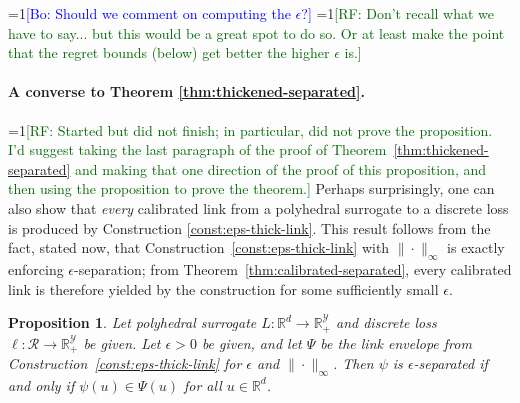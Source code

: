 \documentclass[11pt]{article}
\newcommand{\Comments}{1}
\newcommand{\mynote}[2]{\ifnum\Comments=1\textcolor{#1}{#2}\fi}
\newcommand{\raf}[1]{\mynote{darkgreen}{[RF: #1]}}
\newcommand{\bo}[1]{\mynote{blue}{[Bo: #1]}}
\newcommand{\reals}{\mathbb{R}}
\newcommand{\R}{\mathcal{R}}
\newcommand{\Y}{\mathcal{Y}}
\newtheorem{proposition}{Proposition}
\begin{document}
\bo{Should we comment on computing the $\epsilon$?}
\raf{Don't recall what we have to say... but this would be a great spot to do so.  Or at least make the point that the regret bounds (below) get better the higher $\epsilon$ is.}

\paragraph{A converse to Theorem \ref{thm:thickened-separated}.}
\raf{Started but did not finish; in particular, did not prove the proposition.  I'd suggest taking the last paragraph of the proof of Theorem~\ref{thm:thickened-separated} and making that one direction of the proof of this proposition, and then using the proposition to prove the theorem.}
Perhaps surprisingly, one can also show that \emph{every} calibrated link from a polyhedral surrogate to a discrete loss is produced by Construction \ref{const:eps-thick-link}.
This result follows from the fact, stated now, that Construction~\ref{const:eps-thick-link} with $\|\cdot\|_\infty$ is exactly enforcing $\epsilon$-separation; from Theorem~\ref{thm:calibrated-separated}, every calibrated link is therefore yielded by the construction for some sufficiently small $\epsilon$.

\begin{proposition}
  Let polyhedral surrogate $L:\reals^d \to \reals^\Y_+$ and discrete loss $\ell:\R\to\reals^\Y_+$ be given.
  Let $\epsilon>0$ be given, and let $\Psi$ be the link envelope from Construction~\ref{const:eps-thick-link} for $\epsilon$ and $\|\cdot\|_\infty$.
  Then $\psi$ is $\epsilon$-separated if and only if $\psi(u) \in \Psi(u)$ for all $u\in\reals^d$.
\end{proposition}
\end{document}
